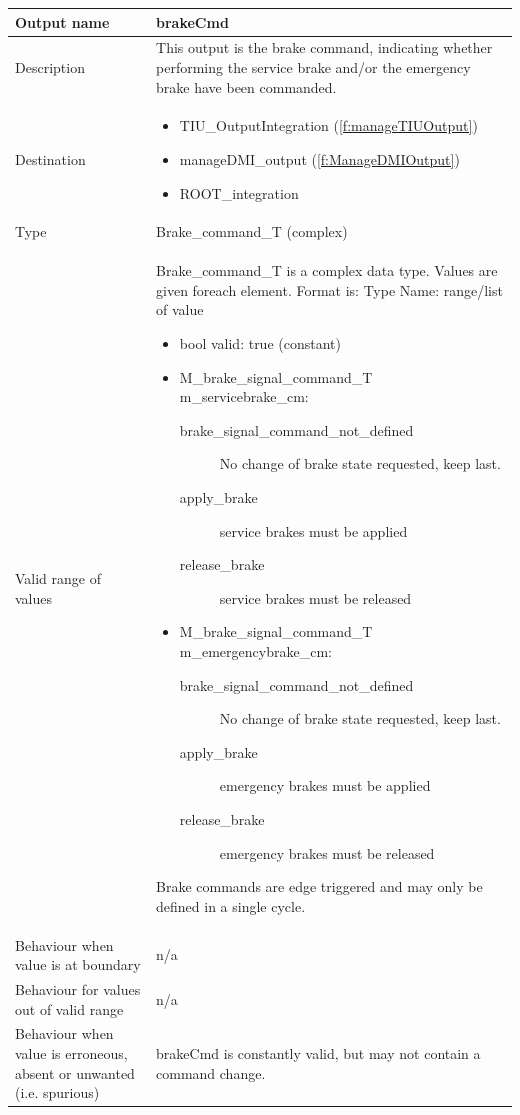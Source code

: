 \begin{longtable}{p{}p{}}
\toprule
Output name				& brakeCmd \\
\midrule
Description				& This output is the brake command, indicating whether performing the service brake and/or the emergency brake have been commanded. \\
\midrule
Destination				& 
\begin{itemize}
\item TIU\_OutputIntegration (\ref{f:manageTIUOutput})
\item manageDMI\_output (\ref{f:ManageDMIOutput})
\item ROOT\_integration 
\end{itemize} \\
\midrule
Type					& Brake\_command\_T (complex)\\
\midrule
Valid range of values	& Brake\_command\_T is a complex data type. Values are given foreach element. Format is: Type Name: range/list of value
\begin{itemize}
\item bool valid: true (constant)
\item M\_brake\_signal\_command\_T m\_servicebrake\_cm:
\begin{description}
\item[brake\_signal\_command\_not\_defined] No change of brake state requested, keep last.
\item[apply\_brake] service brakes must be applied
\item[release\_brake] service brakes must be released
\end{description}
\item M\_brake\_signal\_command\_T m\_emergencybrake\_cm:
\begin{description}
\item[brake\_signal\_command\_not\_defined] No change of brake state requested, keep last.
\item[apply\_brake] emergency brakes must be applied
\item[release\_brake] emergency brakes must be released
\end{description}
\end{itemize}
Brake commands are edge triggered and may only be defined in a single cycle. \\
\midrule
Behaviour when value is at boundary	& n/a \\
\midrule
Behaviour for values out of valid range	& n/a \\
\midrule
Behaviour when value is erroneous, absent or unwanted (i.e. spurious) & brakeCmd is constantly valid, but may not contain a command change. \\
\bottomrule
\end{longtable}


